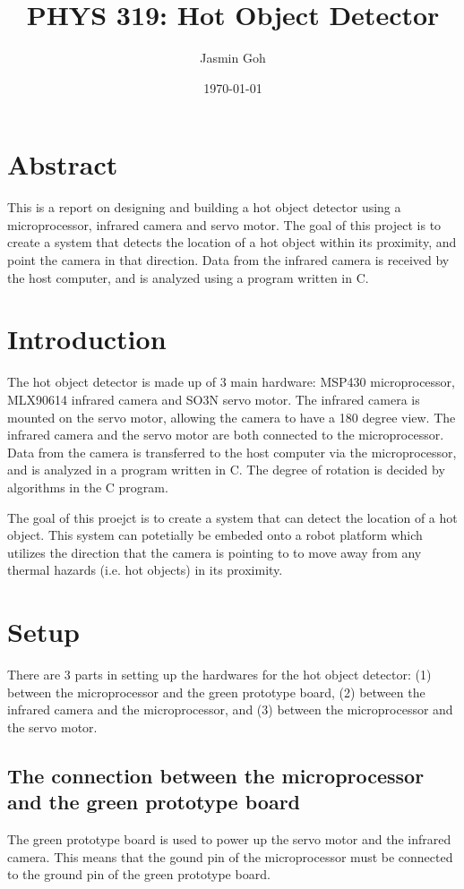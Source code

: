 \documentclass[12pt]{article}
\title{PHYS 319: Hot Object Detector}
\author{Jasmin Goh}
\date{\today}
\begin{document}
\maketitle

\section {Abstract}
This is a report on designing and building a hot object detector using a microprocessor, infrared camera and servo motor. The goal of this project is to create a system that detects the location of a hot object within its proximity, and point the camera in that direction. Data from the infrared camera is received by the host computer, and is analyzed using a program written in C.

\section {Introduction}
The hot object detector is made up of 3 main hardware: MSP430 microprocessor, MLX90614 infrared camera and SO3N servo motor. The infrared camera is mounted on the servo motor, allowing the camera to have a 180 degree view. The infrared camera and the servo motor are both connected to the microprocessor. Data from the camera is transferred to the host computer via the microprocessor, and is analyzed in a program written in C. The degree of rotation is decided by algorithms in the C program.

The goal of this proejct is to create a system that can detect the location of a hot object. This system can potetially be embeded onto a robot platform which utilizes the direction that the camera is pointing to to move away from any thermal hazards (i.e. hot objects) in its proximity.

\section {Setup}
There are 3 parts in setting up the hardwares for the hot object detector: (1) between the microprocessor and the green prototype board, (2) between the infrared camera and the microprocessor, and (3) between the microprocessor and the servo motor.

\subsection {The connection between the microprocessor and the green prototype board}
The green prototype board is used to power up the servo motor and the infrared camera. This means that the gound pin of the microprocessor must be connected to the ground pin of the green prototype board.
\end{document}
